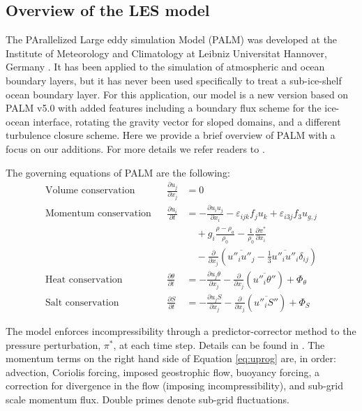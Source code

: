 \documentclass[draft]{agujournal2019}
\begin{document}
\subsection{Overview of the LES model}

The PArallelized Large eddy simulation Model (PALM) was developed at the Institute of Meteorology and Climatology at Leibniz Universitat Hannover, Germany \cite{raasch_palm-large-eddy_2001}. It has been applied to the simulation of atmospheric and ocean boundary layers, but it has never been used specifically to treat a sub-ice-shelf ocean boundary layer. For this application, our model is a new version based on PALM v5.0 \cite{maronga_parallelized_2015} with added features including a boundary flux scheme for the ice-ocean interface, rotating the gravity vector for sloped domains, and a different turbulence closure scheme. Here we provide a brief overview of PALM with a focus on our additions. For more details we refer readers to .

The governing equations of PALM are the following:\\
\begin{align}
    \textrm{Volume conservation} & &
        \frac{\partial u_j}{\partial x_j} &= 0\label{eq:volconserv}\\
    \textrm{Momentum conservation} & &
        \frac{\partial u_i}{\partial t} &= 
        -\frac{\partial u_i u_j}{\partial x_i}
        -\varepsilon_{ijk} f_j u_k 
        + \varepsilon_{i3j} f_3 u_{g,j}\nonumber\\
     &&& \quad + g_i \frac{\rho - \rho_a}{\rho_0} 
        - \frac{1}{\rho_0}\frac{\partial \pi^*}{\partial x_i} \nonumber\\
     &&& \quad - \frac{\partial}{\partial x_j}\left(\overline{u''_i u''_j} 
        - \frac{1}{3}\overline{u''_i u''_i}\delta_{ij}\right) \label{eq:uprog}\\
    \textrm{Heat conservation} & &
        \frac{\partial \theta}{\partial t} &= 
        -\frac{\partial u_j \theta}{\partial x_j} 
        - \frac{\partial}{\partial x_j}\left(\overline{u''_i \theta''}\right) 
        + \Phi_{\theta}\label{eq:ptprog}\\
    \textrm{Salt conservation} & &
        \frac{\partial S}{\partial t} &= 
        -\frac{\partial u_j S}{\partial x_j} 
        - \frac{\partial}{\partial x_j}\left(\overline{u''_i S''}\right) 
        + \Phi_{S}\label{eq:saprog}
\end{align}

The model enforces incompressibility through a predictor-corrector method to the pressure perturbation, $\pi^*$, at each time step. Details can be found in \cite{maronga_parallelized_2015}. The momentum terms on the right hand side of Equation \ref{eq:uprog} are, in order: advection, Coriolis forcing, imposed geostrophic flow, buoyancy forcing, a correction for divergence in the flow (imposing incompressibility), and sub-grid scale momentum flux. Double primes denote sub-grid fluctuations. 
\end{document}
